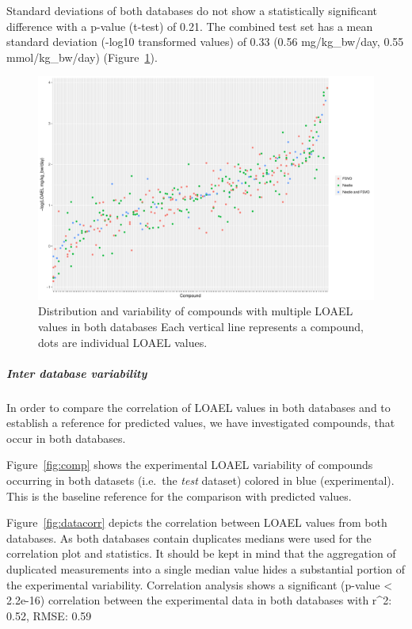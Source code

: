 \documentclass[]{achemso}
\let\oldsubparagraph\subparagraph
\renewcommand{\subparagraph}[1]{\oldsubparagraph{#1}\mbox{}}
\begin{document}
Standard deviations of both databases do not show a statistically
significant difference with a p-value (t-test) of 0.21. The combined
test set has a mean standard deviation (-log10 transformed values) of
0.33 (0.56 mg/kg\_bw/day, 0.55 mmol/kg\_bw/day)
(Figure~\ref{fig:intra}).

\begin{figure}
\centering
\includegraphics{figures/dataset-variability.pdf}
\caption{Distribution and variability of compounds with multiple LOAEL
values in both databases Each vertical line represents a compound, dots
are individual LOAEL values.}\label{fig:intra}
\end{figure}

\subparagraph{Inter database
variability}\label{inter-database-variability}

In order to compare the correlation of LOAEL values in both databases
and to establish a reference for predicted values, we have investigated
compounds, that occur in both databases.

Figure~\ref{fig:comp} shows the experimental LOAEL variability of
compounds occurring in both datasets (i.e.~the \emph{test} dataset)
colored in blue (experimental). This is the baseline reference for the
comparison with predicted values.

Figure~\ref{fig:datacorr} depicts the correlation between LOAEL values
from both databases. As both databases contain duplicates medians were
used for the correlation plot and statistics. It should be kept in mind
that the aggregation of duplicated measurements into a single median
value hides a substantial portion of the experimental variability.
Correlation analysis shows a significant (p-value \textless{} 2.2e-16)
correlation between the experimental data in both databases with r\^{}2:
0.52, RMSE: 0.59
\end{document}
